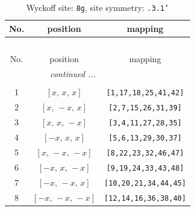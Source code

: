 \documentclass[fleqn,8pt]{jsarticle}
\begin{document}
\renewcommand{\arraystretch}{1.2}
\begin{longtable}{ccc}
\caption{Wyckoff site: {\tt 8g}, site symmetry: {\tt .3.1'}}
 \\
 \hline \hline
No. & position & mapping \\ \hline \endfirsthead

\multicolumn{2}{l}{\tablename\ \thetable{}} \\
 \hline \hline
No. & position & mapping \\ \hline \endhead

 \hline \hline
\multicolumn{2}{r}{\footnotesize\it continued ...} \\ \endfoot

 \hline \hline
\multicolumn{2}{r}{} \\ \endlastfoot

1 & $\left[ x,\, x,\, x \right]$ & {\tt [1,17,18,25,41,42]} \\ \hline
2 & $\left[ x,\, - x,\, x \right]$ & {\tt [2,7,15,26,31,39]} \\ \hline
3 & $\left[ x,\, x,\, - x \right]$ & {\tt [3,4,11,27,28,35]} \\ \hline
4 & $\left[ - x,\, x,\, x \right]$ & {\tt [5,6,13,29,30,37]} \\ \hline
5 & $\left[ x,\, - x,\, - x \right]$ & {\tt [8,22,23,32,46,47]} \\ \hline
6 & $\left[ - x,\, x,\, - x \right]$ & {\tt [9,19,24,33,43,48]} \\ \hline
7 & $\left[ - x,\, - x,\, x \right]$ & {\tt [10,20,21,34,44,45]} \\ \hline
8 & $\left[ - x,\, - x,\, - x \right]$ & {\tt [12,14,16,36,38,40]} \\
\end{longtable}
\renewcommand{\arraystretch}{1.2}
\end{document}
